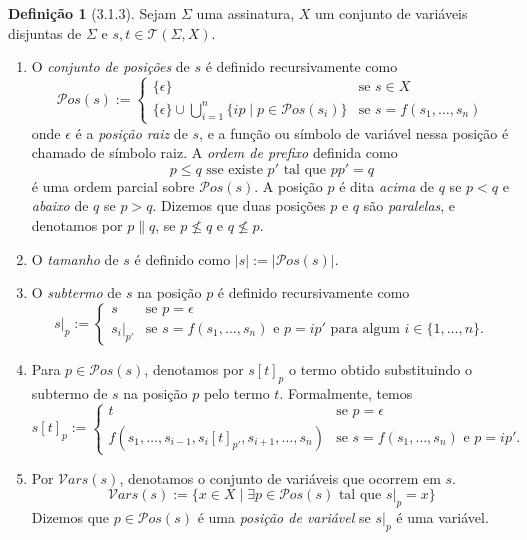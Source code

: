 \documentclass[a4paper]{article}
\newcommand{\vars}[1]{\mathcal{V}ars(#1)}
\newcommand{\pos}[1]{\mathcal{P}os(#1)}
\newcommand{\terms}[2]{\mathcal{T}(#1, #2)}
\newcommand{\termpos}[1]{|_{#1}}
\newcommand{\subpos}[2]{[#1]_{#2}}
\theoremstyle{definition}
\newtheorem{definition}{Definição}
\theoremstyle{plain}
\begin{document}
	\begin{definition}[3.1.3]
		Sejam \(\Sigma\) uma assinatura, \(X\) um conjunto de variáveis disjuntas de \(\Sigma\) e \(s,t\in \terms{\Sigma}{X}\).
		\begin{enumerate}
			\item O {\em conjunto de posições} de \(s\) é definido recursivamente como
				\[\pos{s} := \begin{cases}
					\{\epsilon\} & \text{se } s \in X \\
					\{\epsilon\} \cup \bigcup_{i=1}^{n}\{i p \mid p \in \pos{s_i}\} & \text{se } s = f(s_1, \ldots, s_n)
				\end{cases}\]
				onde \(\epsilon\) é a {\em posição raiz} de \(s\), e a função ou símbolo de variável nessa posição é chamado de símbolo raiz. A {\em ordem de prefixo} definida como
					\[p \leq q \text{ sse existe } p' \text{ tal que } pp' = q\]
				é uma ordem parcial sobre \(\pos{s}\). A posição \(p\) é dita {\em acima} de \(q\) se \(p < q\) e {\em abaixo} de \(q\) se \(p > q\). Dizemos que duas posições \(p\) e \(q\) são {\em paralelas}, e denotamos por \(p \parallel q\), se \(p \not\leq q\) e \(q \not\leq p\).
			\item O {\em tamanho} de \(s\) é definido como \(|s| := |\pos{s}|\).
			\item O {\em subtermo} de \(s\) na posição \(p\) é definido recursivamente como
				\[s\termpos{p} := \begin{cases}
					s & \text{se } p = \epsilon \\
					s_i\termpos{p'} & \text{se } s = f(s_1, \ldots, s_n) \text{ e } p = ip' \text{ para algum } i \in \{1, \ldots, n\}.
				\end{cases}\]
			\item Para \(p\in \pos{s}\), denotamos por \(s\subpos{t}{p}\) o termo obtido substituindo o subtermo de \(s\) na posição \(p\) pelo termo \(t\). Formalmente, temos
				\[s\subpos{t}{p} := \begin{cases}
					t & \text{se } p = \epsilon \\
					f(s_1, \ldots, s_{i-1}, s_i\subpos{t}{p'}, s_{i+1}, \ldots, s_n) & \text{se } s = f(s_1, \ldots, s_n) \text{ e } p = ip'.
				\end{cases}\]
			\item Por \(\vars{s}\), denotamos o conjunto de variáveis que ocorrem em \(s\).
				\[\vars{s} := \{x \in X \mid \exists p \in \pos{s} \text{ tal que } s\termpos{p} = x\}\]
			Dizemos que \(p\in\pos{s}\) é uma {\em posição de variável} se \(s\termpos{p}\) é uma variável.
		\end{enumerate}
	\end{definition}
\end{document}
